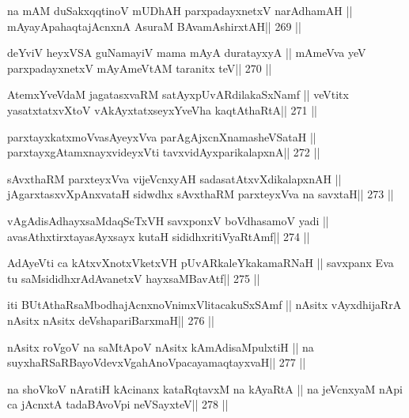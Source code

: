 \begin{shl}
na mAM duSakxqqtinoV mUDhAH parxpadayxnetxV narAdhamAH ||
mAyayA\s pahaqtajAcnxnA AsuraM BAvamAshirxtAH\hfill || 269 ||
\end{shl}

\begin{shl}
deYviV heyxVSA guNamayiV mama mAyA duratayxyA ||
mAmeVva yeV parxpadayxnetxV mAyAmeVtAM taranitx teV\hfill || 270 ||
\end{shl}

\begin{shl}
AtemxYveVdaM jagatasxvaRM satAyxpUvARdilakaSxNamf ||
veVtitx yasatxtatxvXtoV vAkAyxtatxseyxYveVha kaqtAthaRtA\hfill || 271 ||
\end{shl}

\begin{shl}
parxtayxkatxmoVvasAyeyxVva parAgAjxcnXnamasheVSataH ||
parxtayxgAtamxnayxvideyxVti tavxvidAyxparikalapxnA\hfill || 272 ||
\end{shl}

\begin{shl}
sAvxthaRM parxteyxVva vijeVcnxyAH sadasatAtxvXdikalapxnAH ||
jAgarxtasxvXpAnxvataH sidwdhx sAvxthaRM parxteyxVva na savxtaH\hfill || 273 ||
\end{shl}

\begin{shl}
vAgAdisAdhayxsaMdaqSeTxVH savxponxV boVdhasamoV yadi ||
avasAthxtirxtayasAyxsayx kutaH sididhxritiVyaRtAmf\hfill || 274 ||
\end{shl}

\begin{shl}
AdAyeVti ca kAtxvXnotxVketxVH pUvARkaleYkakamaRNaH ||
savxpanx Eva tu saMsididhxrAdAvanetxV hayxsaMBavAtf\hfill || 275 ||
\end{shl}

\begin{shl}
iti BUtAthaRsaMbodhajAcnxnoVnimxVlitacakuSxSAmf ||
nAsitx vAyxdhijaRrA nAsitx nAsitx deVshapariBarxmaH\hfill || 276 ||
\end{shl}

\begin{shl}
nAsitx roVgoV na saMtApoV nAsitx kAmAdisaMpulxtiH ||
na suyxhaRSaRBayoVdevxVgahAnoVpacayamaqtayxvaH\hfill || 277 ||
\end{shl}

\begin{shl}
na shoVkoV nAratiH kAcinanx kataRqtavxM na kAyaRtA ||
na jeVcnxyaM nApi ca jAcnxtA tadaBAvoV\s pi neVSayxteV\hfill || 278 ||
\end{shl}

